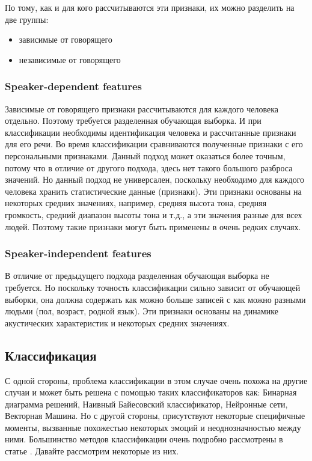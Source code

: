 \documentclass[14pt]{extarticle}
\begin{document}
По тому, как и для кого рассчитываются эти признаки, их можно разделить на две группы: 
\begin{itemize}
	\item зависимые от говорящего
	\item независимые от говорящего
\end{itemize}

\subsubsection{Speaker-dependent features}
Зависимые от говорящего признаки рассчитываются для каждого человека отдельно. Поэтому требуется разделенная обучающая выборка. И при классификации необходимы идентификация человека и рассчитанные признаки для его речи. Во время классификации сравниваются полученные признаки с его персональными признаками. Данный подход может оказаться более точным, потому что в отличие от другого подхода, здесь нет такого большого разброса значений. Но данный подход не универсален, поскольку необходимо для каждого человека хранить статистические данные (признаки). Эти признаки основаны на некоторых средних значениях, например, средняя высота тона, средняя громкость, средний диапазон высоты тона и т.д., а эти значения разные для всех людей. Поэтому такие признаки могут быть применены в очень редких случаях.
\subsubsection{Speaker-independent features}
В отличие от предыдущего подхода разделенная обучающая выборка не требуется. Но поскольку точность классификации сильно зависит от обучающей выборки, она должна содержать как можно больше записей с как можно разными людьми (пол, возраст, родной язык). Эти признаки основаны на динамике акустических характеристик и некоторых средних значениях.


\subsection{Классификация}
С одной стороны, проблема классификации в этом случае очень похожа на другие случаи и может быть решена с помощью таких классификаторов как: Бинарная диаграмма решений, Наивный Байесовский классификатор, Нейронные сети, Векторная Машина.
Но с другой стороны, присутствуют некоторые специфичные моменты, вызванные похожестью некоторых эмоций и неоднозначностью между ними. Большинство методов классификации очень подробно рассмотрены в статье
 \cite{SirishaSirvinasSiva}. Давайте рассмотрим некоторые из них.
\end{document}
